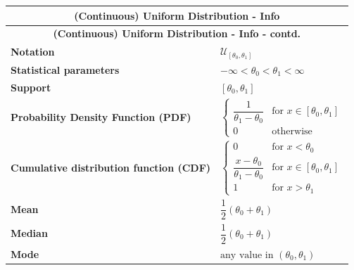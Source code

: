 \renewcommand{\arraystretch}{2}
\begin{longtable}{|m{6cm}|p{9cm}|}
    \hline
    \multicolumn{2}{|c|}{\textbf{(Continuous) Uniform Distribution - Info} \cite{wiki/Continuous_uniform_distribution}} \\
    \hline\endfirsthead

    \hline
    \multicolumn{2}{|c|}{\textbf{(Continuous) Uniform Distribution - Info - contd.} \cite{wiki/Continuous_uniform_distribution}} \\
    \hline\endhead
    
    \hline\endfoot
    \hline\endlastfoot

    \hline
    \textbf{Notation} & 
    ${\displaystyle {\mathcal {U}}_{[\theta_0,\theta_1]}}$
    \\ \hline

    \textbf{Statistical parameters} & 
    ${\displaystyle -\infty <\theta_0<\theta_1<\infty }$
    \\ \hline
    
    \textbf{Support} & 
    ${\displaystyle [\theta_0,\theta_1]}$
    \\ \hline

    \textbf{Probability Density Function (PDF)} & 
    ${\displaystyle {\begin{cases}{\dfrac {1}{\theta_1-\theta_0}}&{\text{for }}x\in [\theta_0,\theta_1]\\0&{\text{otherwise}}\end{cases}}}$
    \\[2ex] \hline
    
    \textbf{Cumulative distribution function (CDF)} & 
    ${\displaystyle {\begin{cases}0&{\text{for }}x<\theta_0\\{\dfrac {x-\theta_0}{\theta_1-\theta_0}}&{\text{for }}x\in [\theta_0,\theta_1]\\1&{\text{for }}x>\theta_1\end{cases}}}$
    \\ \hline

    \textbf{Mean} & 
    ${\displaystyle {\dfrac {1}{2}}(\theta_0+\theta_1)}$
    \\[1ex] \hline

    \textbf{Median} & 
    ${\displaystyle {\dfrac {1}{2}}(\theta_0+\theta_1)}$
    \\[1ex] \hline

    \textbf{Mode} & 
    ${\displaystyle {\text{any value in }}(\theta_0,\theta_1)}$
    \\ \hline


\end{longtable}
